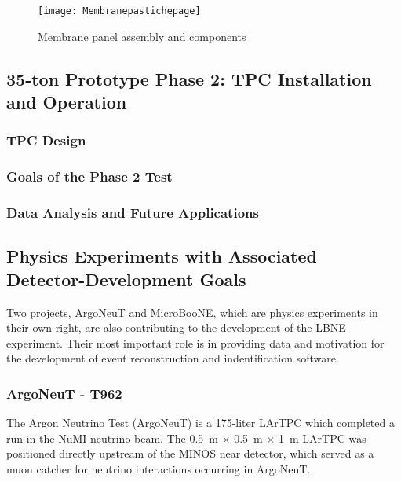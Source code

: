 \begin{figure}
\centering 
{\texttt{[image: Membranepastichepage]}}
\caption{Membrane panel assembly and components}
\label{3panel}
\end{figure}

\subsection{35-ton Prototype Phase 2: TPC Installation and Operation}

\subsubsection{TPC Design}

\subsubsection{Goals of the Phase 2 Test}

\subsubsection{Data Analysis and Future Applications}


\subsection{Physics Experiments with Associated Detector-Development Goals}
Two projects, ArgoNeuT and MicroBooNE,  which are physics experiments in their own right, are also contributing to the development of the LBNE experiment. Their most important role is in providing data and motivation for the development of event reconstruction and indentification software.

\subsubsection{ArgoNeuT - T962}
The Argon Neutrino Test (ArgoNeuT) is a 175-liter LArTPC which completed a run in the NuMI neutrino beam.  The 0.5~m $\times$ 0.5~m $\times$ 1~m LArTPC was positioned directly upstream of the MINOS near detector, which served as a muon catcher for neutrino interactions occurring in ArgoNeuT. 

